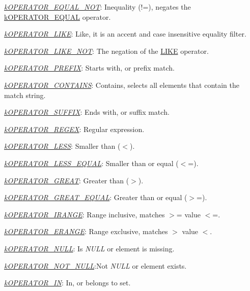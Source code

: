 \begin{DoxyItemize}
\begin{DoxyItemize}
\begin{DoxyItemize}
\begin{DoxyItemize}
\item {\itshape \hyperlink{}{k\-O\-P\-E\-R\-A\-T\-O\-R\-\_\-\-E\-Q\-U\-A\-L\-\_\-\-N\-O\-T}\/}\-: Inequality (!=), negates the \hyperlink{}{k\-O\-P\-E\-R\-A\-T\-O\-R\-\_\-\-E\-Q\-U\-A\-L} operator. 
\item {\itshape \hyperlink{}{k\-O\-P\-E\-R\-A\-T\-O\-R\-\_\-\-L\-I\-K\-E}\/}\-: Like, it is an accent and case insensitive equality filter. 
\item {\itshape \hyperlink{}{k\-O\-P\-E\-R\-A\-T\-O\-R\-\_\-\-L\-I\-K\-E\-\_\-\-N\-O\-T}\/}\-: The negation of the \hyperlink{}{L\-I\-K\-E} operator. 
\item {\itshape \hyperlink{}{k\-O\-P\-E\-R\-A\-T\-O\-R\-\_\-\-P\-R\-E\-F\-I\-X}\/}\-: Starts with, or prefix match. 
\item {\itshape \hyperlink{}{k\-O\-P\-E\-R\-A\-T\-O\-R\-\_\-\-C\-O\-N\-T\-A\-I\-N\-S}\/}\-: Contains, selects all elements that contain the match string. 
\item {\itshape \hyperlink{}{k\-O\-P\-E\-R\-A\-T\-O\-R\-\_\-\-S\-U\-F\-F\-I\-X}\/}\-: Ends with, or suffix match. 
\item {\itshape \hyperlink{}{k\-O\-P\-E\-R\-A\-T\-O\-R\-\_\-\-R\-E\-G\-E\-X}\/}\-: Regular expression. 
\item {\itshape \hyperlink{}{k\-O\-P\-E\-R\-A\-T\-O\-R\-\_\-\-L\-E\-S\-S}\/}\-: Smaller than ($<$). 
\item {\itshape \hyperlink{}{k\-O\-P\-E\-R\-A\-T\-O\-R\-\_\-\-L\-E\-S\-S\-\_\-\-E\-Q\-U\-A\-L}\/}\-: Smaller than or equal ($<$=). 
\item {\itshape \hyperlink{}{k\-O\-P\-E\-R\-A\-T\-O\-R\-\_\-\-G\-R\-E\-A\-T}\/}\-: Greater than ($>$). 
\item {\itshape \hyperlink{}{k\-O\-P\-E\-R\-A\-T\-O\-R\-\_\-\-G\-R\-E\-A\-T\-\_\-\-E\-Q\-U\-A\-L}\/}\-: Greater than or equal ($>$=). 
\item {\itshape \hyperlink{}{k\-O\-P\-E\-R\-A\-T\-O\-R\-\_\-\-I\-R\-A\-N\-G\-E}\/}\-: Range inclusive, matches $>$= value $<$=. 
\item {\itshape \hyperlink{}{k\-O\-P\-E\-R\-A\-T\-O\-R\-\_\-\-E\-R\-A\-N\-G\-E}\/}\-: Range exclusive, matches $>$ value $<$. 
\item {\itshape \hyperlink{}{k\-O\-P\-E\-R\-A\-T\-O\-R\-\_\-\-N\-U\-L\-L}\/}\-: Is {\itshape N\-U\-L\-L\/} or element is missing. 
\item {\itshape \hyperlink{}{k\-O\-P\-E\-R\-A\-T\-O\-R\-\_\-\-N\-O\-T\-\_\-\-N\-U\-L\-L}\/}\-:Not {\itshape N\-U\-L\-L\/} or element exists. 
\item {\itshape \hyperlink{}{k\-O\-P\-E\-R\-A\-T\-O\-R\-\_\-\-I\-N}\/}\-: In, or belongs to set. 

\end{DoxyItemize}
\end{DoxyItemize}
\end{DoxyItemize}
\end{DoxyItemize}
